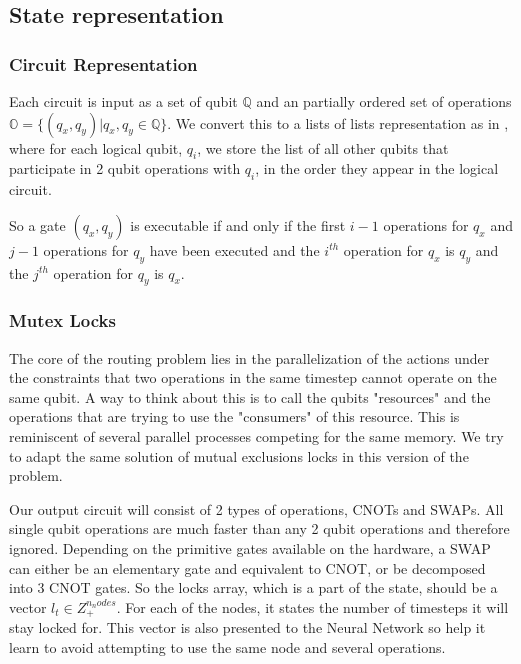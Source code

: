\documentclass[%
 reprint,
 amsmath,amssymb,
 aps,
]{revtex4-2}
\begin{document}
\subsection{\label{sec:method-state}State representation}

\subsubsection{\label{sec:method-state-circuit}Circuit Representation}

Each circuit is input as a set of qubit $\mathbb{Q}$ and an partially ordered set of operations $\mathbb{O} = \{(q_x, q_y) \vert q_x, q_y \in \mathbb{Q}\}$.
We convert this to a lists of lists representation as in \citet{qroute_dqn2}, where for each logical qubit, $q_i$, we store the list of all other qubits that participate in 2 qubit operations with $q_i$, in the order they appear in the logical circuit.

\label{para:method-state-circuit-gatecond}So a gate $(q_x, q_y)$ is executable if and only if the first $i - 1$ operations for $q_x$ and $j - 1$ operations for $q_y$ have been executed and the $i^{th}$ operation for $q_x$ is $q_y$ and the $j^{th}$ operation for $q_y$ is $q_x$.

\subsubsection{\label{sec:method-state-mutex}Mutex Locks}

The core of the routing problem lies in the parallelization of the actions under the constraints that two operations in the same timestep cannot operate on the same qubit. A way to think about this is to call the qubits "resources" and the operations that are trying to use the "consumers" of this resource. This is reminiscent of several parallel processes competing for the same memory. We try to adapt the same solution of mutual exclusions locks \citep{mutex_dijkstra} in this version of the problem.

Our output circuit will consist of 2 types of operations, CNOTs and SWAPs. All single qubit operations are much faster than any 2 qubit operations and therefore ignored. Depending on the primitive gates available on the hardware, a SWAP can either be an elementary gate and equivalent to CNOT, or be decomposed into 3 CNOT gates. So the locks array, which is a part of the state, should be a vector $l_t \in Z_+^{n_nodes}$. For each of the nodes, it states the number of timesteps it will stay locked for. This vector is also presented to the Neural Network so help it learn to avoid attempting to use the same node and several operations.
\end{document}
